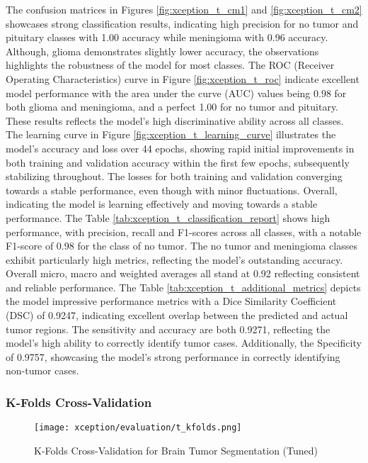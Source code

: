 The confusion matrices in Figures \ref{fig:xception_t_cm1} and \ref{fig:xception_t_cm2} showcases strong classification results, indicating high precision for no tumor and pituitary classes with 1.00 accuracy while meningioma with 0.96 accuracy. Although, glioma demonstrates slightly lower accuracy, the observations highlights the robustness of the model for most classes. 
The ROC (Receiver Operating Characteristics) curve in Figure \ref{fig:xception_t_roc} indicate excellent model performance with the area under the curve (AUC) values being 0.98 for both glioma and meningioma, and a perfect 1.00 for no tumor and pituitary. These results reflects the model's high discriminative ability across all classes.
The learning curve in Figure \ref{fig:xception_t_learning_curve} illustrates the model's accuracy and loss over 44 epochs, showing rapid initial improvements in both training and validation accuracy within the first few epochs, subsequently stabilizing throughout. The losses for both training and validation converging towards a stable performance, even though with minor fluctuations. Overall, indicating the model is learning effectively and moving towards a stable performance. 
The Table \ref{tab:xception_t_classification_report} shows high performance, with precision, recall and F1-scores across all classes, with a notable F1-score of 0.98 for the class of no tumor. The no tumor and meningioma classes exhibit particularly high metrics, reflecting the model's outstanding accuracy. Overall micro, macro and weighted averages all stand at 0.92 reflecting consistent and reliable performance. 
The Table \ref{tab:xception_t_additional_metrics} depicts the model impressive performance metrics with a Dice Similarity Coefficient (DSC) of 0.9247, indicating excellent overlap between the predicted and actual tumor regions. The sensitivity and accuracy are both 0.9271, reflecting the model's high ability to correctly identify tumor cases. Additionally, the Specificity of 0.9757, showcasing the model's strong performance in correctly identifying non-tumor cases.


\subsubsection{K-Folds Cross-Validation}

\begin{figure}[H]
  \begin{center}
    \texttt{[image: xception/evaluation/t\_kfolds.png]}
  \end{center}
  \caption{K-Folds Cross-Validation for Brain Tumor Segmentation (Tuned)}\label{f:xception_kfolds}
\end{figure}

